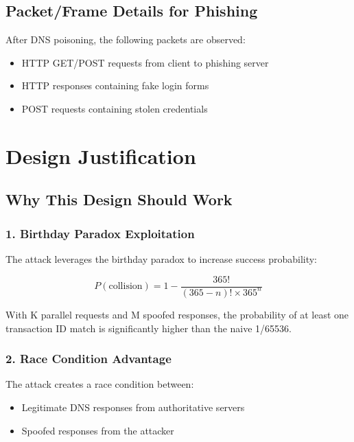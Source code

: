 \documentclass[12pt,a4paper]{article}
\begin{document}
\subsection{Packet/Frame Details for Phishing}

After DNS poisoning, the following packets are observed:
\begin{itemize}
    \item HTTP GET/POST requests from client to phishing server
    \item HTTP responses containing fake login forms
    \item POST requests containing stolen credentials
\end{itemize}

\section{Design Justification}

\subsection{Why This Design Should Work}

\subsubsection{1. Birthday Paradox Exploitation}

The attack leverages the birthday paradox to increase success probability:

\begin{equation}
P(\text{collision}) = 1 - \frac{365!}{(365-n)! \times 365^n}
\end{equation}

With K parallel requests and M spoofed responses, the probability of at least one transaction ID match is significantly higher than the naive 1/65536.

\subsubsection{2. Race Condition Advantage}

The attack creates a race condition between:
\begin{itemize}
    \item Legitimate DNS responses from authoritative servers
    \item Spoofed responses from the attacker
\end{itemize}
\end{document}
